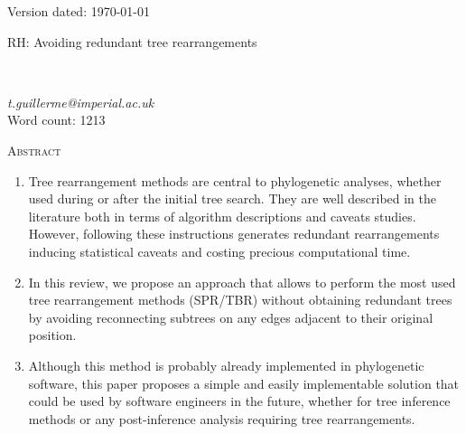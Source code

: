 \documentclass[12pt,letterpaper]{article}
\renewcommand{\section}[1]{%
\bigskip
\begin{center}
\begin{Large}
\normalfont\scshape #1
\medskip
\end{Large}
\end{center}}
\begin{document}

\begin{flushright}
Version dated: \today
\end{flushright}
\bigskip
\noindent RH: Avoiding redundant tree rearrangements

\bigskip
\medskip
\begin{center}

\bigskip

\\ %
\end{center}
\medskip
{} \textit{t.guillerme@imperial.ac.uk}\\  %
\medskip
Word count: 1213
\vspace{1in}

\modulolinenumbers[1]
\linenumbers

%
%

\newpage
\section{Abstract}
\begin{enumerate}
    \item Tree rearrangement methods are central to phylogenetic analyses, whether used during or after the initial tree search. They are well described in the literature both in terms of algorithm descriptions and caveats studies. However, following these instructions generates redundant rearrangements inducing statistical caveats and costing precious computational time.
    \item In this review, we propose an approach that allows to perform the most used tree rearrangement methods (SPR/TBR) without obtaining redundant trees by avoiding reconnecting subtrees on any edges adjacent to their original position.
    \item Although this method is probably already implemented in phylogenetic software, this paper proposes a simple and easily implementable solution that could be used by software engineers in the future, whether for tree inference methods or any post-inference analysis requiring tree rearrangements.
\end{enumerate}
\end{document}
